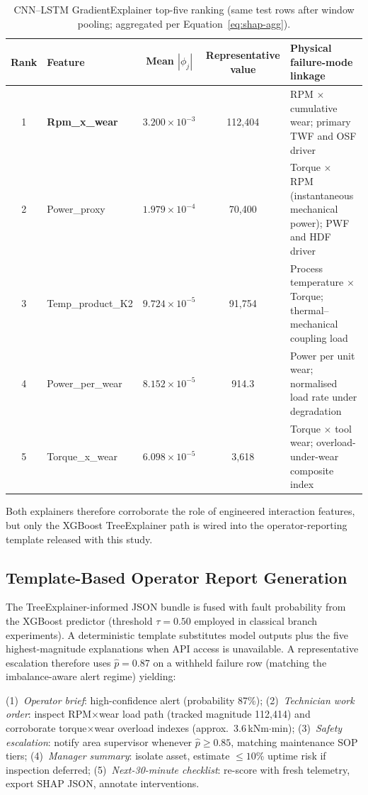 \documentclass[sensors,article,submit,pdftex,moreauthors]{Definitions/mdpi}
\newcommand{\mdpitablefont}{\footnotesize}
\begin{document}
\begin{table}[H]
\caption{CNN--LSTM GradientExplainer top-five ranking (same test rows
after window pooling; aggregated per Equation~\ref{eq:shap-agg}).\label{tab:shap_cnn}}
\centering
\mdpitablefont
\begin{tabularx}{\textwidth}{clccX}
\toprule
\textbf{Rank} & \textbf{Feature} & \textbf{Mean $|\phi_j|$} &
\textbf{Representative value} & \textbf{Physical failure-mode linkage} \\
\midrule
1 & \textbf{Rpm\_x\_wear}  & $3.200 \times 10^{-3}$ & 112{,}404 &
  RPM $\times$ cumulative wear; primary TWF and OSF driver \\
2 & Power\_proxy           & $1.979 \times 10^{-4}$ & 70{,}400 &
  Torque $\times$ RPM (instantaneous mechanical power); PWF and HDF driver \\
3 & Temp\_product\_K2      & $9.724 \times 10^{-5}$ & 91{,}754 &
  Process temperature $\times$ Torque; thermal--mechanical coupling load \\
4 & Power\_per\_wear       & $8.152 \times 10^{-5}$ & 914.3 &
  Power per unit wear; normalised load rate under degradation \\
5 & Torque\_x\_wear        & $6.098 \times 10^{-5}$ & 3{,}618 &
  Torque $\times$ tool wear; overload-under-wear composite index \\
\bottomrule
\end{tabularx}
\end{table}

Both explainers therefore corroborate the role of engineered interaction
features, but only the XGBoost TreeExplainer path is wired into the
operator-reporting template released with this study.

\subsection{Template-Based Operator Report Generation}

The TreeExplainer-informed JSON bundle is fused with fault probability from
the XGBoost predictor (threshold $\tau=0.50$ employed in classical branch
experiments). A deterministic template substitutes model outputs plus the
five highest-magnitude explanations when API access is unavailable.
A representative escalation therefore uses $\hat{p} = 0.87$ on a withheld
failure row (matching the imbalance-aware alert regime) yielding:

(1)~\textit{Operator brief}: high-confidence alert (probability 87\%);
(2)~\textit{Technician work order}: inspect RPM$\times$wear load path
(tracked magnitude 112{,}414) and corroborate torque$\times$wear overload
indexes (approx.\ 3.6\,kNm$\cdot$min);
(3)~\textit{Safety escalation}: notify area supervisor whenever
$\hat{p} \ge 0.85$, matching maintenance SOP tiers;
(4)~\textit{Manager summary}: isolate asset, estimate $\le 10$\% uptime
risk if inspection deferred;
(5)~\textit{Next-30-minute checklist}: re-score with fresh telemetry,
export SHAP JSON, annotate interventions.
\end{document}

